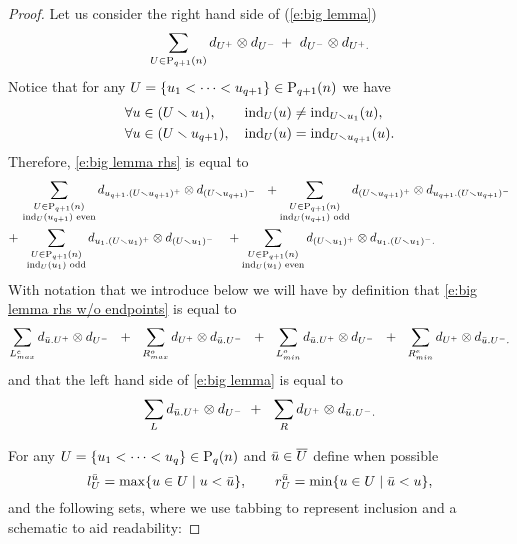 \begin{proof}
	Let us consider the right hand side of (\ref{e:big lemma})
	\begin{equation} \label{e:big lemma rhs}
	\sum_{U \in \P_{q+1}(n)} d_{U^+} \otimes d_{U^-}\, +\ d_{U^-} \otimes d_{U^+.}
	\end{equation}
	Notice that for any $U = \{u_1 < \cdots < u_{q+1}\} \in \P_{q+1}(n)$ we have
	\begin{align*}
	& \forall u \in (U \sm u_1), \qquad \ind_{U}(u) \neq \ind_{U \sm u_1}(u), \\
	& \forall u \in (U \sm u_{q+1}), \quad \ind_{U}(u) = \ind_{U \sm u_{q+1}}(u).
	\end{align*}
	Therefore, \eqref{e:big lemma rhs} is equal to
	\begin{equation} \label{e:big lemma rhs w/o endpoints}
	\begin{split}
	&\, \sum_{\substack{U \in \P_{q+1}(n) \\ \ind_U(u_{q+1}) \text{ even}}}
	d_{u_{q+1}.(U \sm u_{q+1})^+} \otimes d_{(U \sm u_{q+1})^-}\ \ + 
	\sum_{\substack{U \in \P_{q+1}(n) \\ \ind_U(u_{q+1}) \text{ odd}}}
	d_{(U \sm u_{q+1})^+} \otimes d_{u_{q+1}.(U \sm u_{q+1})^-} \\ +
	&\ \,\sum_{\substack{U \in \P_{q+1}(n) \\ \ind_U(u_1) \text{ odd}}} d_{u_1.(U \sm u_1)^+} \otimes d_{(U\sm u_1)^-} \quad +
	\sum_{\substack{U \in \P_{q+1}(n) \\ \ind_U(u_1) \text{ even}}} d_{(U \sm u_1)^+} \otimes d_{u_1.(U\sm u_1)^-.}
	\end{split}
	\end{equation}
	With notation that we introduce below we will have by definition that \eqref{e:big lemma rhs w/o endpoints} is equal to
	\begin{equation} \label{e:big lemma rhs promising} 
	\sum_{{L}_{max}^{e}} d_{\bu.U^+} \otimes d_{U^-}\ \ +\ \ 
	\sum_{{R}_{max}^{o}} d_{U^+} \otimes d_{\bu.U^-}\ \ +\ \ 
	\sum_{{L}_{min}^{o}} d_{\bu.U^+} \otimes d_{U^-}\ \ +\ \ 
	\sum_{{R}_{min}^{e}} d_{U^+} \otimes d_{\bu.U^-.}
	\end{equation}
	and that the left hand side of \eqref{e:big lemma} is equal to
	\begin{equation} \label{e:big lemma lhs}
	\sum_{L} d_{\bu.U^+} \otimes d_{U^-}\ +\ \ 
	\sum_{R} d_{U^+} \otimes d_{\bu.U^-.}
	\end{equation}
	
	For any $U = \{u_1 < \cdots < u_q\} \in \P_{q}(n)$ and $\bu \in \overline{U}$ define when possible
	\begin{equation*}
	l_U^\bu = \max \{u \in U \mid u < \bu\}, \qquad
	r_U^\bu = \min\{u \in U \mid \bu < u\},
	\end{equation*}
	and the following sets, where we use tabbing to represent inclusion and a schematic to aid readability:
	

\end{proof}

